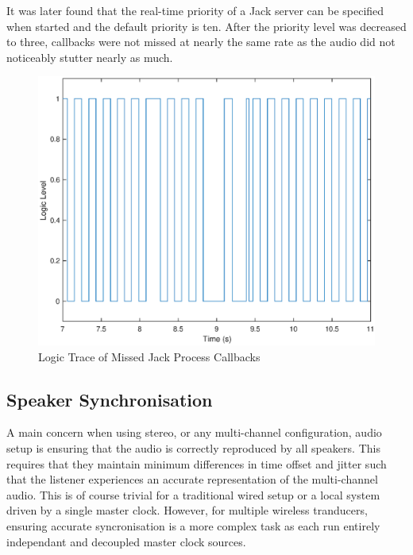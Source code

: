 \documentclass[main.tex]{subfiles}
\begin{document}
\medskip
It was later found that the real-time priority of a Jack server can be specified when started and the default priority is ten.
After the priority level was decreased to three, callbacks were not missed at nearly the same rate as the audio did not noticeably stutter nearly as much.

\begin{figure}[H]
    \centering
    \includegraphics[scale=0.75]{./figs/missed-callbacks.eps}        
    \caption{Logic Trace of Missed Jack Process Callbacks}
    \label{fig:callbacks}
\end{figure}

\subsection{Speaker Synchronisation}
A main concern when using stereo, or any multi-channel configuration, audio setup is ensuring that the audio is correctly reproduced by all speakers.
This requires that they maintain minimum differences in time offset and jitter such that the listener experiences an accurate representation of the multi-channel audio.
This is of course trivial for a traditional wired setup or a local system driven by a single master clock.
However, for multiple wireless tranducers, ensuring accurate syncronisation is a more complex task as each run entirely independant and decoupled master clock sources.
\end{document}
